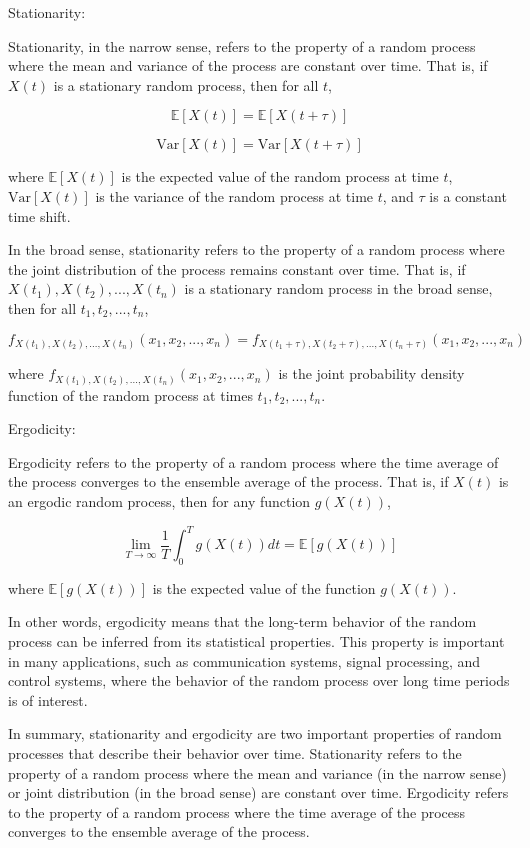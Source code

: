 \documentclass[12pt, a4paper, oneside]{article}
\begin{document}
Stationarity:

Stationarity, in the narrow sense, refers to the property of a random process where the mean and variance of the process are constant over time. That is, if $X(t)$ is a stationary random process, then for all $t$,

$$ \mathbb{E}[X(t)] = \mathbb{E}[X(t+\tau)] $$

$$ \text{Var}[X(t)] = \text{Var}[X(t+\tau)] $$

where $\mathbb{E}[X(t)]$ is the expected value of the random process at time $t$, $\text{Var}[X(t)]$ is the variance of the random process at time $t$, and $\tau$ is a constant time shift.

In the broad sense, stationarity refers to the property of a random process where the joint distribution of the process remains constant over time. That is, if $X(t_1),X(t_2),...,X(t_n)$ is a stationary random process in the broad sense, then for all $t_1,t_2,...,t_n$,

$$ f_{X(t_1),X(t_2),...,X(t_n)}(x_1,x_2,...,x_n) = f_{X(t_1+\tau),X(t_2+\tau),...,X(t_n+\tau)}(x_1,x_2,...,x_n) $$

where $f_{X(t_1),X(t_2),...,X(t_n)}(x_1,x_2,...,x_n)$ is the joint probability density function of the random process at times $t_1,t_2,...,t_n$.

Ergodicity:

Ergodicity refers to the property of a random process where the time average of the process converges to the ensemble average of the process. That is, if $X(t)$ is an ergodic random process, then for any function $g(X(t))$,

$$ \lim_{T \rightarrow \infty} \frac{1}{T} \int_0^T g(X(t))dt = \mathbb{E}[g(X(t))] $$

where $\mathbb{E}[g(X(t))]$ is the expected value of the function $g(X(t))$.

In other words, ergodicity means that the long-term behavior of the random process can be inferred from its statistical properties. This property is important in many applications, such as communication systems, signal processing, and control systems, where the behavior of the random process over long time periods is of interest.

In summary, stationarity and ergodicity are two important properties of random processes that describe their behavior over time. Stationarity refers to the property of a random process where the mean and variance (in the narrow sense) or joint distribution (in the broad sense) are constant over time. Ergodicity refers to the property of a random process where the time average of the process converges to the ensemble average of the process.
\end{document}
